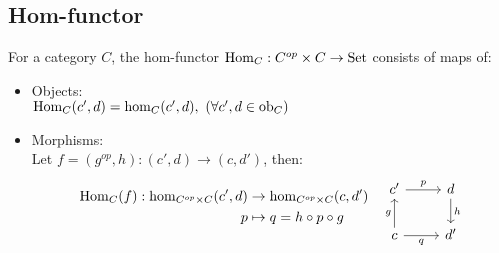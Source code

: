 \subsection*{Hom-functor}
For a category $C$, the hom-functor $\mathrm{Hom}_C : C^{op}\times C \to
\mathrm{Set}$ consists of maps of: \parencite{maclane:working_mathematician}
\begin{itemize}
  \item Objects:\\
    $\mathrm{Hom}_C (c', d) = \hom_C (c', d),
      \ (\forall c', d\in \mathrm{ob}_C)$
  \item Morphisms:\\
    Let $f=(g^{op}, h): (c', d)\to (c, d')$, then:
    \[
      \begin{aligned}
        \Hom_C (f) : \hom_{C^{op}\times C}(c', d) &\to
          \hom_{C^{op}\times C}(c, d')\\
        p &\mapsto q = h\circ p\circ g
      \end{aligned}\quad
      \begin{tikzcd}
      {c'} & d \\
      c & {d'}
      \arrow["g", from=2-1, to=1-1]
      \arrow["h", from=1-2, to=2-2]
      \arrow["p", from=1-1, to=1-2]
      \arrow["q"', from=2-1, to=2-2]
      \end{tikzcd}
    \]
\end{itemize}